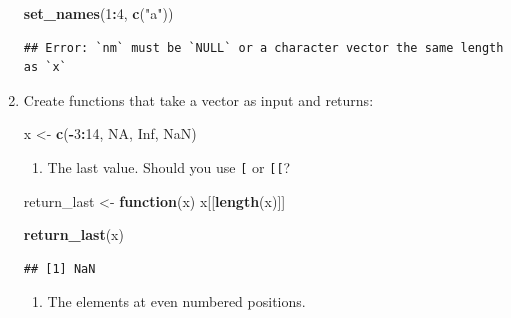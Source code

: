 \documentclass[]{book}
\newenvironment{Shaded}{\begin{snugshade}}{\end{snugshade}}
\newcommand{\ControlFlowTok}[1]{\textcolor[rgb]{0.13,0.29,0.53}{\textbf{#1}}}
\newcommand{\DecValTok}[1]{\textcolor[rgb]{0.00,0.00,0.81}{#1}}
\newcommand{\KeywordTok}[1]{\textcolor[rgb]{0.13,0.29,0.53}{\textbf{#1}}}
\newcommand{\NormalTok}[1]{#1}
\newcommand{\OperatorTok}[1]{\textcolor[rgb]{0.81,0.36,0.00}{\textbf{#1}}}
\newcommand{\OtherTok}[1]{\textcolor[rgb]{0.56,0.35,0.01}{#1}}
\newcommand{\StringTok}[1]{\textcolor[rgb]{0.31,0.60,0.02}{#1}}
\providecommand{\tightlist}{%
  \setlength{\itemsep}{0pt}\setlength{\parskip}{0pt}}
\theoremstyle{definition}
\theoremstyle{definition}
\theoremstyle{definition}
\theoremstyle{remark}
\begin{document}
\begin{enumerate}
\begin{Shaded}
\begin{Highlighting}[]
\KeywordTok{set_names}\NormalTok{(}\DecValTok{1}\OperatorTok{:}\DecValTok{4}\NormalTok{, }\KeywordTok{c}\NormalTok{(}\StringTok{"a"}\NormalTok{)) }
\end{Highlighting}
\end{Shaded}

\begin{verbatim}
## Error: `nm` must be `NULL` or a character vector the same length as `x`
\end{verbatim}
\item
  Create functions that take a vector as input and returns:

\begin{Shaded}
\begin{Highlighting}[]
\NormalTok{x <-}\StringTok{ }\KeywordTok{c}\NormalTok{(}\OperatorTok{-}\DecValTok{3}\OperatorTok{:}\DecValTok{14}\NormalTok{, }\OtherTok{NA}\NormalTok{, }\OtherTok{Inf}\NormalTok{, }\OtherTok{NaN}\NormalTok{)}
\end{Highlighting}
\end{Shaded}

  \begin{enumerate}
  \def\labelenumii{\arabic{enumii}.}
  \tightlist
  \item
    The last value. Should you use \texttt{{[}} or \texttt{{[}{[}}?
  \end{enumerate}

\begin{Shaded}
\begin{Highlighting}[]
\NormalTok{return_last <-}\StringTok{ }\ControlFlowTok{function}\NormalTok{(x) x[[}\KeywordTok{length}\NormalTok{(x)]]}

\KeywordTok{return_last}\NormalTok{(x)}
\end{Highlighting}
\end{Shaded}

\begin{verbatim}
## [1] NaN
\end{verbatim}

  \begin{enumerate}
  \def\labelenumii{\arabic{enumii}.}
  \tightlist
  \item
    The elements at even numbered positions.
  \end{enumerate}

\begin{Shaded}
\begin{Highlighting}[]
\NormalTok{return_even <-}\StringTok{ }\ControlFlowTok{function}\NormalTok{(x) x[((}\DecValTok{1}\OperatorTok{:}\KeywordTok{length}\NormalTok{(x)) }\OperatorTok{%

}
\end{Highlighting}
\end{Shaded}
\end{enumerate}
\end{document}

